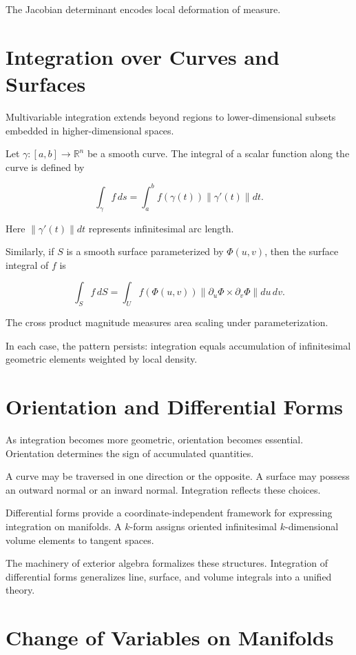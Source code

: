 \documentclass[12pt]{book}
\begin{document}
The Jacobian determinant encodes local deformation of measure.

\section{Integration over Curves and Surfaces}

Multivariable integration extends beyond regions to lower-dimensional subsets embedded in higher-dimensional spaces.

Let $\gamma : [a,b] \to \mathbb{R}^n$ be a smooth curve. The integral of a scalar function along the curve is defined by

\[
\int_\gamma f\, ds
=
\int_a^b f(\gamma(t)) \| \gamma'(t) \| dt.
\]

Here $\| \gamma'(t) \| dt$ represents infinitesimal arc length.

Similarly, if $S$ is a smooth surface parameterized by $\Phi(u,v)$, then the surface integral of $f$ is

\[
\int_S f\, dS
=
\int_U f(\Phi(u,v)) \| \partial_u \Phi \times \partial_v \Phi \| du\, dv.
\]

The cross product magnitude measures area scaling under parameterization.

In each case, the pattern persists: integration equals accumulation of infinitesimal geometric elements weighted by local density.

\section{Orientation and Differential Forms}

As integration becomes more geometric, orientation becomes essential. Orientation determines the sign of accumulated quantities.

A curve may be traversed in one direction or the opposite. A surface may possess an outward normal or an inward normal. Integration reflects these choices.

Differential forms provide a coordinate-independent framework for expressing integration on manifolds. A $k$-form assigns oriented infinitesimal $k$-dimensional volume elements to tangent spaces.

The machinery of exterior algebra formalizes these structures. Integration of differential forms generalizes line, surface, and volume integrals into a unified theory.

\section{Change of Variables on Manifolds}
\end{document}
